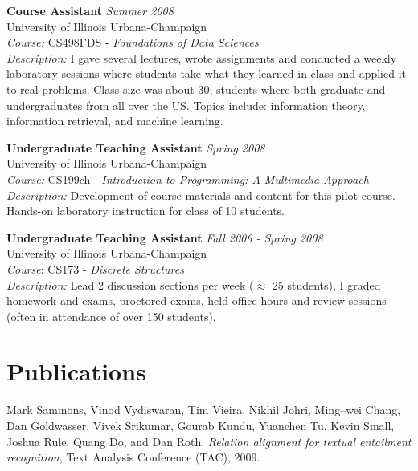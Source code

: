 \documentclass{report}
\begin{document}
{\bf Course Assistant} \hfill {\it Summer 2008} \\
University of Illinois Urbana-Champaign \\
{\sl Course:} CS498FDS - {\sl Foundations of Data Sciences} \\
{\sl Description:} I gave several lectures, wrote assignments and conducted a weekly laboratory sessions where students take what they learned in class and applied it to real problems. Class size was about 30; students where both graduate and undergraduates from all over the US. Topics include: information theory, information retrieval, and machine learning.
				
{\bf Undergraduate Teaching Assistant} \hfill {\it Spring 2008} \\
University of Illinois Urbana-Champaign \\
{\sl Course:} CS199ch - {\sl Introduction to Programming: A Multimedia             Approach} \\
{\sl Description:} Development of course materials and content for this         pilot course. Hands-on laboratory instruction for class of 10 students.

{\bf Undergraduate Teaching Assistant} \hfill {\it Fall 2006 - Spring 2008} \\
University of Illinois Urbana-Champaign \\
{\sl Course}: CS173 - {\sl Discrete Structures} \\
{\sl Description:} Lead 2 discussion sections per week ($\approx$ 25 students), I graded homework and exams, proctored exams, held office hours and review sessions (often in attendance of over 150 students).



\section*{Publications} 

%
%

Mark Sammons, Vinod Vydiswaran, Tim Vieira, Nikhil Johri, Ming--wei Chang,
Dan Goldwasser, Vivek Srikumar, Gourab Kundu, Yuanchen Tu, Kevin Small,
Joshua Rule, Quang Do, and Dan Roth, \emph{Relation alignment for textual entailment recognition}, Text Analysis Conference (TAC), 2009.
\end{document}

